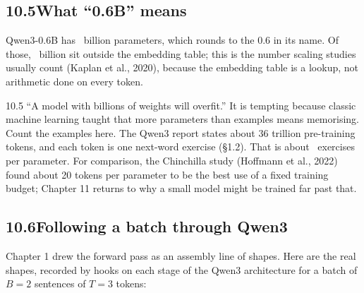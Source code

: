 
\subsection*{10.5\quad What ``0.6B'' means}

Qwen3-0.6B has \nTenQwenBillions\ billion parameters, which rounds to the 0.6 in its name. Of those,
\nTenQwenNonEmbBillions\ billion sit outside the embedding table; this is the number scaling studies usually
count (Kaplan et al., 2020), because the embedding table is a lookup, not arithmetic done on every token.

\begin{wrongidea}{10.5}
``A model with billions of weights will overfit.'' It is tempting because classic machine learning taught that more
parameters than examples means memorising. Count the examples here. The Qwen3 report states about 36 trillion
pre-training tokens, and each token is one next-word exercise (\S1.2). That is about \nTenTokensPerParam\ exercises
per parameter. For comparison, the Chinchilla study (Hoffmann et al., 2022) found about 20 tokens per parameter to
be the best use of a fixed training budget; Chapter 11 returns to why a small model might be trained far past that.
\end{wrongidea}


\subsection*{10.6\quad Following a batch through Qwen3}

Chapter 1 drew the forward pass as an assembly line of shapes. Here are the real shapes, recorded by hooks on
each stage of the Qwen3 architecture for a batch of $B=2$ sentences of $T=3$ tokens:

